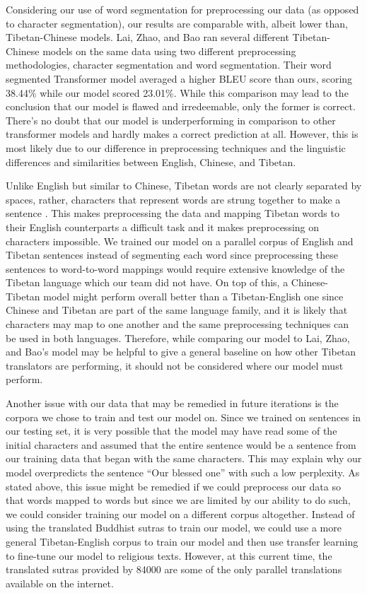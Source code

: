 \documentclass[letterpaper, 12 pt, conference]{ieeeconf}  %
\begin{document}
Considering our use of word segmentation for preprocessing our data (as opposed to character segmentation), our results are comparable with, albeit lower than, Tibetan-Chinese models. Lai, Zhao, and Bao \cite{2} ran several different Tibetan-Chinese models on the same data using two different preprocessing methodologies, character segmentation and word segmentation. Their word segmented Transformer model averaged a higher BLEU score than ours, scoring 38.44\% while our model scored 23.01\%. While this comparison may lead to the conclusion that our model is flawed and irredeemable, only the former is correct. There’s no doubt that our model is underperforming in comparison to other transformer models and hardly makes a correct prediction at all. However, this is most likely due to our difference in preprocessing techniques and the linguistic differences and similarities between English, Chinese, and Tibetan. 

Unlike English but similar to Chinese, Tibetan words are not clearly separated by spaces, rather, characters that represent words are strung together to make a sentence \cite{5}. This makes preprocessing the data and mapping Tibetan words to their English counterparts a difficult task and it makes preprocessing on characters impossible. We trained our model on a parallel corpus of English and Tibetan sentences instead of segmenting each word since preprocessing these sentences to word-to-word mappings would require extensive knowledge of the Tibetan language which our team did not have. On top of this, a Chinese-Tibetan model might perform overall better than a Tibetan-English one since Chinese and Tibetan are part of the same language family, and it is likely that characters may map to one another and the same preprocessing techniques can be used in both languages. Therefore, while comparing our model to Lai, Zhao, and Bao’s \cite{2} model may be helpful to give a general baseline on how other Tibetan translators are performing, it should not be considered where our model must perform.

Another issue with our data that may be remedied in future iterations is the corpora we chose to train and test our model on. Since we trained on sentences in our testing set, it is very possible that the model may have read some of the initial characters and assumed that the entire sentence would be a sentence from our training data that began with the same characters. This may explain why our model overpredicts the sentence “Our blessed one” with such a low perplexity. As stated above, this issue might be remedied if we could preprocess our data so that words mapped to words but since we are limited by our ability to do such, we could consider training our model on a different corpus altogether. Instead of using the translated Buddhist sutras to train our model, we could use a more general Tibetan-English corpus to train our model and then use transfer learning to fine-tune our model to religious texts. However, at this current time, the translated sutras provided by 84000 \cite{8} are some of the only parallel translations available on the internet. 
\end{document}

